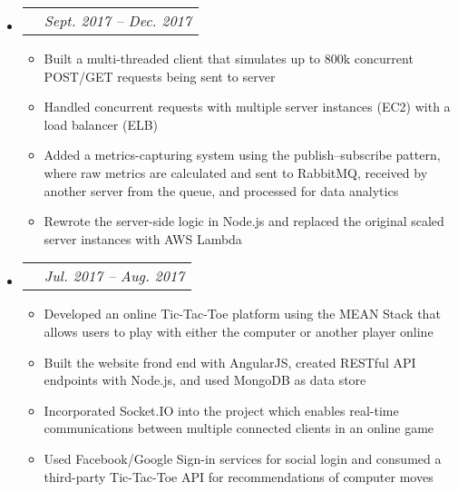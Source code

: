 \documentclass{article}
\makeatletter
\newcommand{\resitem}[1]{
    \item #1
    \vspace{-2pt}
}
\newcommand{\ressubheadingproj}[2]{
\begin{tabular*}{6.80in}{l@{\extracolsep{\fill}}r}
    \textbf{#1} & \textit{#2} \\
\end{tabular*}\vspace{-6pt}}
\makeatother
\begin{document}
    \begin{itemize}
        \item\ressubheadingproj
        {\href
        {https://github.com/jeremylinlin/cs6650-scalable-distributed-systems}
        {Distributed Ski Data Processing Engine}
        }
        {Sept. 2017 -- Dec. 2017}
        {\footnotesize
        \begin{itemize}
            \resitem
            {Built a multi-threaded client that simulates up to 800k concurrent POST/GET
            requests being sent to server}
            \resitem
            {Handled concurrent requests with multiple server instances (EC2)
            with a load balancer (ELB)}
            \resitem
            {Added a metrics-capturing system using the publish--subscribe pattern, where
            raw metrics are calculated and sent to RabbitMQ, received by another server
            from the queue, and processed for data analytics}
            \resitem
            {Rewrote the server-side logic in Node.js and replaced the original scaled server
            instances with AWS Lambda}

        \end{itemize}
        }
    \end{itemize}

    \begin{itemize}
        \item\ressubheadingproj
        {\href
        {https://github.com/jeremylinlin/tic-tac-toe-mean}
        {Multiplayer Tic-Tac-Toe Game Platform}
        }
        {Jul. 2017 -- Aug. 2017}
        {\footnotesize
        \begin{itemize}
            \resitem
            {Developed an online Tic-Tac-Toe platform using the MEAN Stack that allows
            users to play with either the computer or another player online}
            \resitem
            {Built the website frond end with AngularJS, created RESTful
            API endpoints with Node.js, and used MongoDB as data store}
            \resitem
            {Incorporated Socket.IO into the project which enables real-time
            communications between multiple connected clients in an online game}
            \resitem
            {Used Facebook/Google Sign-in services for social login and consumed a
            third-party Tic-Tac-Toe API for recommendations of computer moves}
        \end{itemize}
        }
    \end{itemize}
\end{document}
